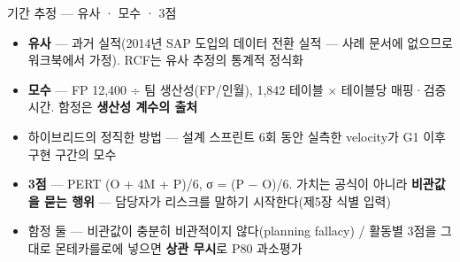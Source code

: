 \begin{frame}{기간 추정 — 유사 · 모수 · 3점}
\begin{itemize}
\item \textbf{유사} — 과거 실적(2014년 SAP 도입의 데이터 전환 실적 — 사례 문서에 없으므로 워크북에서 가정). RCF는 유사 추정의 통계적 정식화
\item \textbf{모수} — FP 12,400 ÷ 팀 생산성(FP/인월), 1,842 테이블 × 테이블당 매핑·검증 시간. 함정은 \textbf{생산성 계수의 출처}
\item 하이브리드의 정직한 방법 — 설계 스프린트 6회 동안 실측한 velocity가 G1 이후 구현 구간의 모수
\item \textbf{3점} — PERT (O + 4M + P)/6, σ = (P $-$ O)/6. 가치는 공식이 아니라 \textbf{비관값을 묻는 행위} — 담당자가 리스크를 말하기 시작한다(제5장 식별 입력)
\item 함정 둘 — 비관값이 충분히 비관적이지 않다(planning fallacy) / 활동별 3점을 그대로 몬테카를로에 넣으면 \textbf{상관 무시}로 P80 과소평가
\end{itemize}
\end{frame}

